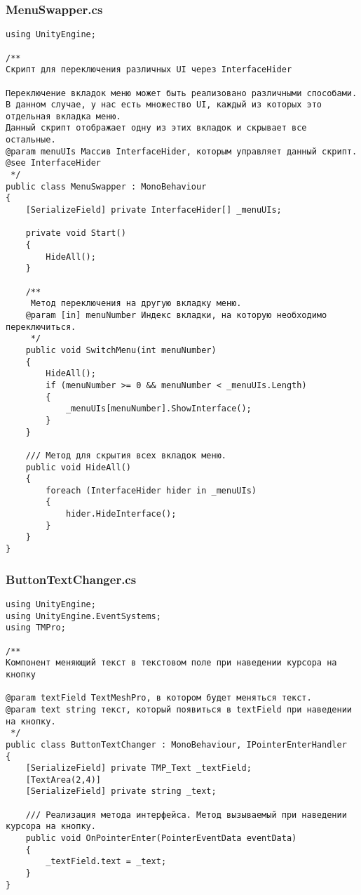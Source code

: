 \subsubsection*{MenuSwapper.cs}
\begin{verbatim}
﻿using UnityEngine;

/**
Скрипт для переключения различных UI через InterfaceHider

Переключение вкладок меню может быть реализовано различными способами.
В данном случае, у нас есть множество UI, каждый из которых это отдельная вкладка меню.
Данный скрипт отображает одну из этих вкладок и скрывает все остальные.
@param menuUIs Массив InterfaceHider, которым управляет данный скрипт.
@see InterfaceHider
 */
public class MenuSwapper : MonoBehaviour
{
    [SerializeField] private InterfaceHider[] _menuUIs;

    private void Start()
    {
        HideAll();
    }

    /**
     Метод переключения на другую вкладку меню.
    @param [in] menuNumber Индекс вкладки, на которую необходимо переключиться.
     */
    public void SwitchMenu(int menuNumber)
    {
        HideAll();
        if (menuNumber >= 0 && menuNumber < _menuUIs.Length)
        {
            _menuUIs[menuNumber].ShowInterface();
        }
    }

    /// Метод для скрытия всех вкладок меню.
    public void HideAll()
    {
        foreach (InterfaceHider hider in _menuUIs)
        {
            hider.HideInterface();
        }
    }
}

\end{verbatim}
\subsubsection*{ButtonTextChanger.cs}
\begin{verbatim}
﻿using UnityEngine;
using UnityEngine.EventSystems;
using TMPro;

/**
Компонент меняющий текст в текстовом поле при наведении курсора на кнопку

@param textField TextMeshPro, в котором будет меняться текст.
@param text string текст, который появиться в textField при наведении на кнопку.
 */
public class ButtonTextChanger : MonoBehaviour, IPointerEnterHandler
{
    [SerializeField] private TMP_Text _textField;
    [TextArea(2,4)]
    [SerializeField] private string _text;

    /// Реализация метода интерфейса. Метод вызываемый при наведении курсора на кнопку.
    public void OnPointerEnter(PointerEventData eventData)
    {
        _textField.text = _text;
    }
}

\end{verbatim}
